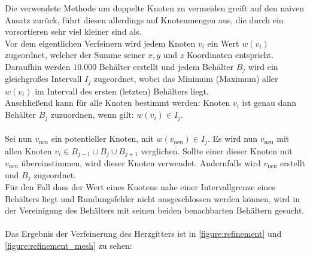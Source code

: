 \documentclass[
	a4paper,			%
	11pt,				%
	headsepline,		%
	bibtotoc,			%
	BCOR18mm,      		%
	DIV14,				%
	headings=normal,
	numbers=noenddot,
]{scrbook}
\theoremstyle{mythmstyle}
\theoremstyle{other}
\begin{document}
	
	Die verwendete Methode um doppelte Knoten zu vermeiden greift auf den naiven Ansatz zurück, führt diesen
	allerdings auf Knotenmengen aus, die durch ein vorsortieren sehr viel kleiner sind als.\\	
	Vor dem eigentlichen Verfeinern wird jedem Knoten $v_i$ ein Wert $w(v_i)$ zugeordnet, welcher der Summe seiner
	 $x,y$ und $z$
	Koordinaten entspricht. Daraufhin werden $10.000$ Behälter erstellt und jedem Behälter $B_j$ wird ein 
	gleichgroßes Intervall $I_j$
	zugeordnet, wobei das Minimum (Maximum) aller $w(v_i)$ im Intervall des ersten (letzten) Behälters liegt.\\
	Anschließend kann für alle Knoten bestimmt werden:
	Knoten $v_i$ ist genau dann Behälter $B_j$ zuzuordnen, wenn gilt: $w(v_i) \in I_j$.\\\\
	 Sei nun $v_{\text{neu}}$
	ein potentieller Knoten, mit $w(v_{\text{neu}}) \in I_j$. Es wird nun $v_{\text{neu}} $ mit allen Knoten
	 $v_i \in B_{j-1}\cup B_{j} \cup B_{j+1}$ verglichen. Sollte einer dieser Knoten mit $v_{\text{neu}}$
	 übereinstimmen, wird dieser Knoten verwendet. Andernfalls wird $v_{\text{neu}}$ erstellt und $B_j$
	  zugeordnet.\\	 
	 Für den Fall dass der Wert eines Knotens nahe einer Intervallgrenze eines Behälters liegt und 
	 Rundungsfehler nicht
	 ausgeschlossen werden können, wird  in der Vereinigung des Behälters mit seinen beiden benachbarten
	 Behältern gesucht.\\\\
	 Das Ergebnis der Verfeinerung des Herzgitters ist in \autoref{figure:refinement} und 
	 \autoref{figure:refinement_mesh} zu sehen:
	 
\end{document}
